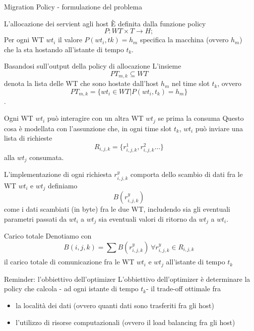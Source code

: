 \documentclass{beamer}
\begin{document}
\begin{frame}[allowframebreaks]{Migration Policy - formulazione del problema}
	\begin{block}{L'allocazione dei servient agli host}
	 È definita dalla funzione policy 
	 \[
	 	P : WT \times T \rightarrow H;
	 \]
	Per ogni WT $wt_i$ il valore $P(wt_i, tk) = h_m$ specifica la macchina (ovvero $h_m$) che la sta hostando all'istante di tempo $t_k$.
	\end{block}
	\begin{block}{Basandosi sull'output della policy di allocazione}
		L'insieme \[PT_{m,k} \subseteq WT\] denota la lista delle WT che sono hostate dall'host $h_m$ nel time slot $t_k$, ovvero \[PT_{m,k} = \{ wt_i \in WT | P(wt_i, t_k) = h_m \}\]. \\
	\end{block}
	\begin{block}{Ogni WT $wt_i$ può interagire con un altra WT $wt_j$ se prima la consuma}
			Questo cosa è modellata con l'assunzione che, in ogni time slot $t_k$, $wt_i$ può inviare una lista di richieste \[R_{i,j,k} = \{ r^1_{i,j,k}, r^2_{i,j,k} ...  \}\] alla $wt_j$ consumata.
	\end{block}

	\begin{block}{L'implementazione di ogni richiesta $r^y_{i,j,k}$ comporta dello scambio di dati fra le WT $wt_i$ e $wt_j$}
		definiamo \[B(r^y_{i,j,k})\] come i dati scambiati (in byte) fra le due WT, includendo sia gli eventuali parametri passati da $wt_i$ a $wt_j$ sia eventuali valori di ritorno da $wt_j$ a $wt_i$.
	\end{block}

	\begin{block}{Carico totale}
		Denotiamo con \[B(i, j, k) = \sum_{}^{} B(r^y_{i,j,k}) \  \forall r^y_{i,j,k} \in R_{i,j,k}\] il carico totale di comunicazione fra le WT $wt_i$ e $wt_j$ all'istante di tempo $t_k$
	\end{block}

	\pagebreak
	
	 \begin{exampleblock}{Reminder: l'obbiettivo dell'optimizer}
	 	L’obbiettivo dell’optimizer è determinare la policy che calcola - ad ogni istante di tempo $t_k$- il trade-off
	 	ottimale fra
	 	\begin{itemize}
	 		\item la località dei dati (ovvero quanti dati sono trasferiti fra gli host)
	 		\item l’utilizzo di risorse computazionali (ovvero il load balancing fra gli host)
	 	\end{itemize}
	 \end{exampleblock}
 

\end{frame}
\end{document}
